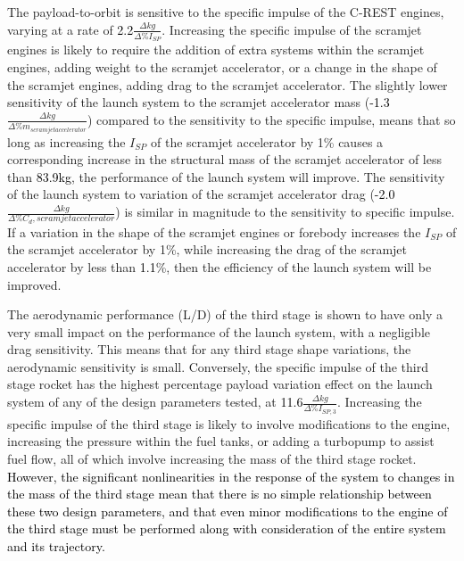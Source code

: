 The payload-to-orbit is sensitive to the specific impulse of the C-REST engines, varying at a rate of \textcolor{black}{2.2}$\frac{\Delta kg}{\Delta\%I_{SP}}$. Increasing the specific impulse of the scramjet engines is likely to require the addition of extra systems within the scramjet engines, adding weight to the scramjet accelerator, or a change in the shape of the scramjet engines, adding drag to the scramjet accelerator. 
The slightly lower sensitivity of the launch system to the scramjet accelerator mass (\textcolor{black}{-1.3}$\frac{\Delta kg}{\Delta\%m_{scramjet accelerator}}$) compared to the sensitivity to the specific impulse, means that so long as increasing the $I_{SP}$ of the scramjet accelerator by 1\% causes a corresponding increase in the structural mass of the scramjet accelerator of less than \textcolor{black}{83.9kg}, the performance of the launch system will improve. 
The sensitivity of the launch system to variation of the scramjet accelerator drag (\textcolor{black}{-2.0}$\frac{\Delta kg}{\Delta\%C_d,{scramjet accelerator}}$) is similar in magnitude to the sensitivity to specific impulse. 
If a variation in the shape of the scramjet engines or forebody increases the $I_{SP}$ of the scramjet accelerator by 1\%, while increasing the drag of the scramjet accelerator by less than \textcolor{black}{1.1}\%, then the efficiency of the launch system will be improved. 

The aerodynamic performance (L/D) of the third stage is shown to have only a very small impact on the performance of the launch system, with a negligible drag sensitivity. This means that for any third stage shape variations, the aerodynamic sensitivity is small.
 Conversely, the specific impulse of the third stage rocket has the highest percentage payload variation effect on the launch system of any of the design parameters tested, at \textcolor{black}{11.6}$\frac{\Delta kg}{\Delta\%I_{SP,3}}$. Increasing the specific impulse of the third stage is likely to involve modifications to the engine, increasing the pressure within the fuel tanks, or adding a turbopump to assist fuel flow, all of which involve increasing the mass of the third stage rocket. 
\textcolor{black}{However, the significant nonlinearities in the response of the system to changes in the mass of the third stage mean that there is no simple relationship between these two design parameters, and that even minor modifications to the engine of the third stage must be performed along with consideration of the entire system and its trajectory.}

